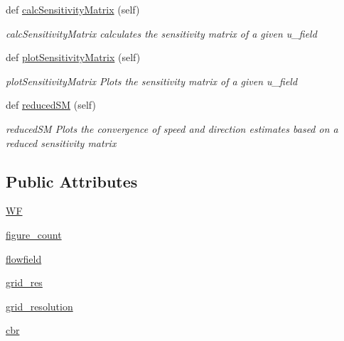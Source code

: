 \begin{DoxyCompactItemize}
def \mbox{\hyperlink{classvisualization__manager___d_j_1_1_visualization_manager_a979c45975c192515cbc17da7c07d2af3}{calc\+Sensitivity\+Matrix}} (self)
\begin{DoxyCompactList}\small\item\em calc\+Sensitivity\+Matrix calculates the sensitivity matrix of a given u\+\_\+field \end{DoxyCompactList}\item 
def \mbox{\hyperlink{classvisualization__manager___d_j_1_1_visualization_manager_a32793e43e3e04b3819dea7740e5b9ca1}{plot\+Sensitivity\+Matrix}} (self)
\begin{DoxyCompactList}\small\item\em plot\+Sensitivity\+Matrix Plots the sensitivity matrix of a given u\+\_\+field \end{DoxyCompactList}\item 
def \mbox{\hyperlink{classvisualization__manager___d_j_1_1_visualization_manager_a92c5f58eddce15c3fa19edd63e66ef43}{reduced\+SM}} (self)
\begin{DoxyCompactList}\small\item\em reduced\+SM Plots the convergence of speed and direction estimates based on a reduced sensitivity matrix \end{DoxyCompactList}\end{DoxyCompactItemize}
\subsection*{Public Attributes}
\begin{DoxyCompactItemize}
\item 
\mbox{\hyperlink{classvisualization__manager___d_j_1_1_visualization_manager_a56add1b450c7ecd758b096117f593578}{WF}}
\item 
\mbox{\hyperlink{classvisualization__manager___d_j_1_1_visualization_manager_add58b653067c1364e389b5a9ea1e4f5b}{figure\+\_\+count}}
\item 
\mbox{\hyperlink{classvisualization__manager___d_j_1_1_visualization_manager_aadb6e88d03aa67b6045f66dcad66799c}{flowfield}}
\item 
\mbox{\hyperlink{classvisualization__manager___d_j_1_1_visualization_manager_ad34898259a1773b5e43ab50eae783e1d}{grid\+\_\+res}}
\item 
\mbox{\hyperlink{classvisualization__manager___d_j_1_1_visualization_manager_ad5b8013f5cdf47f6384ae56186810e2b}{grid\+\_\+resolution}}
\item 
\mbox{\hyperlink{classvisualization__manager___d_j_1_1_visualization_manager_a5ebbc21771a576316065fac66b67c292}{cbr}}
\end{DoxyCompactItemize}


